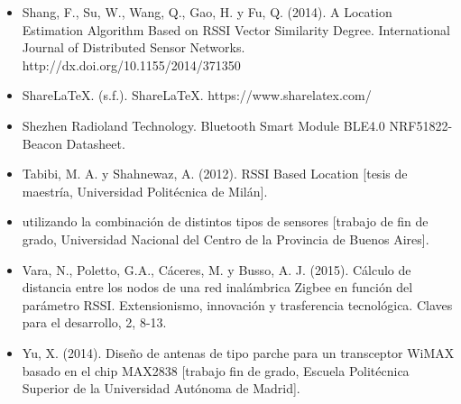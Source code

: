 \documentclass[paper=a4, fontsize=11pt,twoside]{scrartcl}	%
\begin{document}
\begin{itemize}
        \item Shang, F., Su, W., Wang, Q., Gao, H. y Fu, Q. (2014). A Location Estimation Algorithm Based on RSSI Vector Similarity Degree. International Journal of Distributed Sensor Networks. http://dx.doi.org/10.1155/2014/371350 
        \item ShareLaTeX. (s.f.). ShareLaTeX. https://www.sharelatex.com/ 
        \item Shezhen Radioland Technology. Bluetooth Smart Module BLE4.0 NRF51822-Beacon Datasheet.
        \item Tabibi, M. A. y Shahnewaz, A. (2012). RSSI Based Location [tesis de maestría, Universidad Politécnica de Milán].
        \item utilizando la combinación de distintos tipos de sensores [trabajo de fin de grado, Universidad Nacional del Centro de la Provincia de Buenos Aires].
        \item Vara, N., Poletto, G.A., Cáceres, M. y Busso, A. J. (2015). Cálculo de distancia entre los nodos de una red inalámbrica Zigbee en función del parámetro RSSI. Extensionismo, innovación y trasferencia tecnológica. Claves para el desarrollo, 2, 8-13.
        \item Yu, X. (2014). Diseño de antenas de tipo parche para un transceptor WiMAX basado en el chip MAX2838 [trabajo fin de grado, Escuela Politécnica Superior de la Universidad Autónoma de Madrid].
    \end{itemize}
\end{document}
